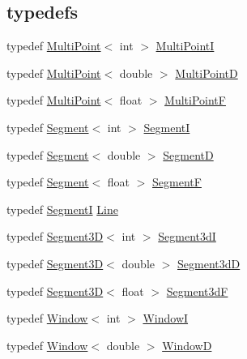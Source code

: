 \subsection*{\textquotesingle{}typedefs\textquotesingle{}}
\begin{DoxyCompactItemize}
\item 
typedef \hyperlink{class_i3_d_1_1_multi_point}{Multi\+Point}$<$ int $>$ \hyperlink{group___geometric_entities_gacd97741d89ded5ad4fbe71d32309e62b}{Multi\+PointI}
\item 
typedef \hyperlink{class_i3_d_1_1_multi_point}{Multi\+Point}$<$ double $>$ \hyperlink{group___geometric_entities_ga17d41c547edd7b9a916383723c0aeaec}{Multi\+PointD}
\item 
typedef \hyperlink{class_i3_d_1_1_multi_point}{Multi\+Point}$<$ float $>$ \hyperlink{group___geometric_entities_ga7e19d99de4e64c17e396f090e87d438b}{Multi\+PointF}
\item 
typedef \hyperlink{class_i3_d_1_1_segment}{Segment}$<$ int $>$ \hyperlink{group___geometric_entities_ga929ca9aa27110ed7f1cf79c92664a6f0}{SegmentI}
\item 
typedef \hyperlink{class_i3_d_1_1_segment}{Segment}$<$ double $>$ \hyperlink{group___geometric_entities_ga34bc194945585b7126a92e06c0571d5a}{SegmentD}
\item 
typedef \hyperlink{class_i3_d_1_1_segment}{Segment}$<$ float $>$ \hyperlink{group___geometric_entities_gade7ab34fb1636ee6e5f7661bd0ae1937}{SegmentF}
\item 
typedef \hyperlink{group___geometric_entities_ga929ca9aa27110ed7f1cf79c92664a6f0}{SegmentI} \hyperlink{group___geometric_entities_ga483b43891a1b33d99406fdc397e9a445}{Line}
\item 
typedef \hyperlink{class_i3_d_1_1_segment3_d}{Segment3D}$<$ int $>$ \hyperlink{group___geometric_entities_ga72a4680dd55c05cb4bb23a5154cde78c}{Segment3dI}
\item 
typedef \hyperlink{class_i3_d_1_1_segment3_d}{Segment3D}$<$ double $>$ \hyperlink{group___geometric_entities_gaffa1ff3b7d6fb99b524c6666e5d8e71c}{Segment3dD}
\item 
typedef \hyperlink{class_i3_d_1_1_segment3_d}{Segment3D}$<$ float $>$ \hyperlink{group___geometric_entities_ga286317644075744b4d6cc62daad74747}{Segment3dF}
\item 
typedef \hyperlink{class_i3_d_1_1_window}{Window}$<$ int $>$ \hyperlink{group___geometric_entities_ga27980d94ceb3f3eb9e0c34e1fe93b073}{WindowI}
\item 
typedef \hyperlink{class_i3_d_1_1_window}{Window}$<$ double $>$ \hyperlink{group___geometric_entities_gac7dc7b0477e34c4c8c43a1710a855b00}{WindowD}

\end{DoxyCompactItemize}
